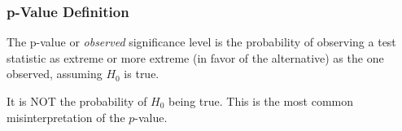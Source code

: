 \documentclass[handout]{beamer}
\newcommand{\blue}[1]{\textcolor{blue2}{#1}}
\begin{document}
\begin{frame}
\frametitle{p-Value Definition}

%
%
The \blue{p-value} or \blue{\textit{observed} significance level} is the probability of observing a test statistic as extreme or more extreme (in favor of the alternative) as the one observed, assuming $H_0$ is true.

\vspace{0.5cm}

It is \blue{NOT} the probability of $H_0$ being true.  This is the most common misinterpretation of the $p$-value.

\end{frame}


%
%
%
%
%
%
\end{document}
